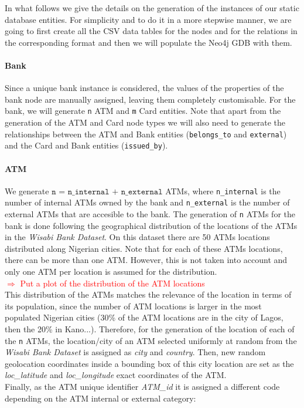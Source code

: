 In what follows we give the details on the generation of the instances of our static database entities.
For simplicity and to do it in a more stepwise manner, we are going to first create all the CSV data tables for the nodes and for the relations in the corresponding format and then we will populate the Neo4j GDB with them.

\paragraph{Bank}

Since a unique bank instance is considered, the values of the properties of the bank node are manually assigned, leaving them completely customisable.
For the bank, we will generate \texttt{n} ATM and \texttt{m} Card entities. Note that apart from the generation of the ATM and Card node types we will also need to generate the relationships between the ATM and Bank entities (\texttt{belongs\_to} and \texttt{external}) and the Card and Bank entities (\texttt{issued\_by}).

\paragraph{ATM}

We generate $\texttt{n = n\_internal + n\_external}$ ATMs, where \texttt{n\_internal} is the number of internal ATMs owned by the bank and \texttt{n\_external} is the number of external ATMs that are accesible to the bank.
The generation of \texttt{n} ATMs for the bank is done following
the geographical distribution of the locations of the ATMs in the \emph{Wisabi Bank Dataset}. 
On this dataset there are 50 ATMs locations distributed along Nigerian cities. 
Note that for each of these ATMs locations, there can be more than one ATM.
However, this is not taken into account and only one ATM per location is assumed for the 
distribution.\\
\textcolor{red}{$\Rightarrow$ Put a plot of the distribution of the ATM locations}\\
This distribution of the ATMs matches the relevance of the location in terms of its population, since the number of ATM locations is larger in the most populated 
Nigerian cities (30\% of the ATM locations are in the city of Lagos, then the 20\% in Kano...). Therefore, for the generation of the location of each of the \texttt{n} ATMs, the location/city of an ATM selected uniformly at random from the \emph{Wisabi Bank Dataset} is assigned as \emph{city} and \emph{country}. Then, new random geolocation coordinates inside a bounding box of this city location are set as the \emph{loc\_latitude} and \emph{loc\_longitude} exact coordinates of the ATM. \\
Finally, as the ATM unique identifier \emph{ATM\_id} it is assigned a different code depending on the ATM internal or external category: 


